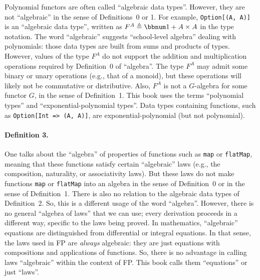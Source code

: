 Polynomial functors are often called \textquotedblleft algebraic data
types\textquotedblright . However, they are not \textquotedblleft algebraic\textquotedblright{}
in the sense of Definitions~0 or 1. For example, \lstinline!Option[(A, A)]!
is an \textquotedblleft algebraic data type\textquotedblright , written
as $F^{A}\triangleq\bbnum 1+A\times A$ in the type notation. The
word \textsf{``}algebraic\textsf{''} suggests \textsf{``}school-level algebra\textsf{''} dealing with
polynomials: those data types are built from sums and products of
types. However, values of the type $F^{A}$ do not support the addition
and multiplication operations required by Definition~0 of \textsf{``}algebra\textsf{''}.
The type $F^{A}$ may admit some binary or unary operations (e.g.,
that of a monoid), but these operations will likely not be commutative
or distributive. Also, $F^{A}$ is not a $G$-algebra for some functor
$G$, in the sense of Definition~1. This book uses the terms \textquotedblleft polynomial
types\textquotedblright{} and \textquotedblleft exponential-polynomial
types\textquotedblright . Data types containing functions, such as
\lstinline!Option[Int => (A, A)]!, are exponential-polynomial (but
not polynomial).

\paragraph{Definition 3.}

One talks about the \textquotedblleft algebra\textquotedblright{}
of properties of functions such as \lstinline!map! or \lstinline!flatMap!,
meaning that these functions satisfy certain \textsf{``}algebraic\textsf{''} laws
(e.g., the composition, naturality, or associativity laws). But these
laws do not make functions \lstinline!map! or \lstinline!flatMap!
into an algebra in the sense of Definition~0 or in the sense of Definition~1.
There is also no relation to the algebraic data types of Definition~2.
So, this is a different usage of the word \textsf{``}algebra\textsf{''}. However,
there is no general \textsf{``}algebra of laws\textsf{''} that we can use; every derivation
proceeds in a different way, specific to the laws being proved. In
mathematics, \textsf{``}algebraic\textsf{''} equations are distinguished from differential
or integral equations. In that sense, the laws used in FP are \emph{always}
algebraic: they are just equations with compositions and applications
of functions. So, there is no advantage in calling laws \textsf{``}algebraic\textsf{''}
within the context of FP. This book calls them \textsf{``}equations\textsf{''} or
just \textsf{``}laws\textsf{''}.

